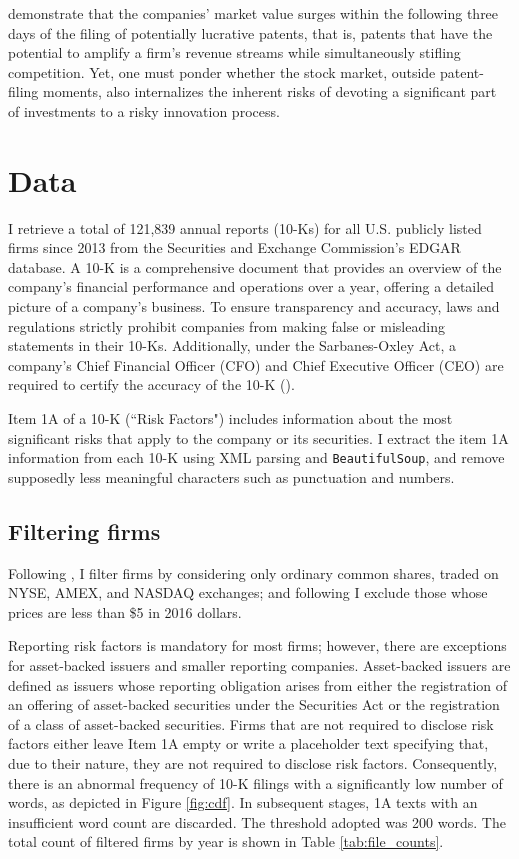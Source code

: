 \documentclass[12pt, letterpaper]{article}
\begin{document}
\citet{Kogan2017-fx} demonstrate that the companies' market value surges within the following three days of the filing of potentially lucrative patents, that is, patents that have the potential to amplify a firm's revenue streams while simultaneously stifling competition. Yet, one must ponder whether the stock market, outside patent-filing moments, also internalizes the inherent risks of devoting a significant part of investments to a risky innovation process.

\section{Data}

I retrieve a total of  121,839 annual reports (10-Ks) for all U.S. publicly listed firms since 2013 from the Securities and Exchange Commission's EDGAR database. A 10-K is a comprehensive document that provides an overview of the company's financial performance and operations over a year, offering a detailed picture of a company's business.  To ensure transparency and accuracy, laws and regulations strictly prohibit companies from making false or misleading statements in their 10-Ks. Additionally, under the Sarbanes-Oxley Act, a company's Chief Financial Officer (CFO) and Chief Executive Officer (CEO) are required to certify the accuracy of the 10-K (\cite{SEC_Office_of_Investor_Education_and_Advocacy2011-tw}).

Item 1A of a 10-K (``Risk Factors") includes information about the most significant risks that apply to the company or its securities.  I extract the item 1A information from each 10-K using XML parsing and \texttt{BeautifulSoup}, and remove supposedly less meaningful characters such as punctuation and numbers.

\subsection{Filtering firms}

Following \cite{Golubov2019-ku, Stambaugh2016-eb}, I filter firms by considering only ordinary common shares, traded on NYSE, AMEX, and NASDAQ exchanges; and following \cite{Stambaugh2016-eb} I exclude those whose prices are less than \$5 in 2016 dollars. 

Reporting risk factors is mandatory for most firms; however, there are exceptions for asset-backed issuers and smaller reporting companies. Asset-backed issuers are defined as issuers whose reporting obligation arises from either the registration of an offering of asset-backed securities under the Securities Act or the registration of a class of asset-backed securities. Firms that are not required to disclose risk factors either leave Item 1A empty or write a placeholder text specifying that, due to their nature, they are not required to disclose risk factors. Consequently, there is an abnormal frequency of 10-K filings with a significantly low number of words, as depicted in Figure \ref{fig:cdf}. In subsequent stages, 1A texts with an insufficient word count are discarded. The threshold adopted was 200 words. The total count of filtered firms by year is shown in Table \ref{tab:file_counts}.
\end{document}
